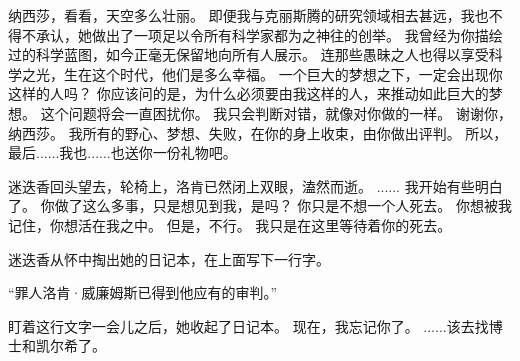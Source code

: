\documentclass[openany]{book}
\begin{document}
\begin{dialogue}
     纳西莎，看看，天空多么壮丽。
     即便我与克丽斯腾的研究领域相去甚远，我也不得不承认，她做出了一项足以令所有科学家都为之神往的创举。
     我曾经为你描绘过的科学蓝图，如今正毫无保留地向所有人展示。
     连那些愚昧之人也得以享受科学之光，生在这个时代，他们是多么幸福。
     一个巨大的梦想之下，一定会出现你这样的人吗？
     你应该问的是，为什么必须要由我这样的人，来推动如此巨大的梦想。
     这个问题将会一直困扰你。
     我只会判断对错，就像对你做的一样。
     谢谢你，纳西莎。
     我所有的野心、梦想、失败，在你的身上收束，由你做出评判。
     所以，最后......我也......也送你一份礼物吧。\par
    迷迭香回头望去，轮椅上，洛肯已然闭上双眼，溘然而逝。
     ......
     我开始有些明白了。
     你做了这么多事，只是想见到我，是吗？
     你只是不想一个人死去。
     你想被我记住，你想活在我之中。
     但是，不行。
     我只是在这里等待着你的死去。\par
    迷迭香从怀中掏出她的日记本，在上面写下一行字。\par
    “罪人洛肯·威廉姆斯已得到他应有的审判。”\par
    盯着这行文字一会儿之后，她收起了日记本。
     现在，我忘记你了。
     ......该去找博士和凯尔希了。
\end{dialogue}
\end{document}
